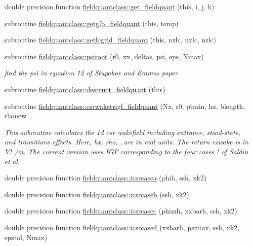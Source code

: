 \begin{DoxyCompactItemize}
double precision function \mbox{\hyperlink{namespacefieldquantclass_a5d4c07c22ffea0330d90b66e590b24a8}{fieldquantclass\+::get\+\_\+fieldquant}} (this, i, j, k)
\item 
subroutine \mbox{\hyperlink{namespacefieldquantclass_a2c0b0d0301e9ae5ccd8b2273ffc95ff3}{fieldquantclass\+::getglb\+\_\+fieldquant}} (this, temp)
\item 
subroutine \mbox{\hyperlink{namespacefieldquantclass_aa439599c2570610c1c2e0bfacc135603}{fieldquantclass\+::getlcgrid\+\_\+fieldquant}} (this, nxlc, nylc, nzlc)
\item 
subroutine \mbox{\hyperlink{namespacefieldquantclass_ae02f70d677d4bedfa6e41bd6cf33d612}{fieldquantclass\+::psiroot}} (r0, xx, deltas, psi, eps, Nmax)
\begin{DoxyCompactList}\small\item\em find the psi in equation 12 of Stupakov and Emma\textquotesingle{}s paper \end{DoxyCompactList}\item 
subroutine \mbox{\hyperlink{namespacefieldquantclass_a4e8922c1e25eef99306f4001c7289ba0}{fieldquantclass\+::destruct\+\_\+fieldquant}} (this)
\item 
subroutine \mbox{\hyperlink{namespacefieldquantclass_ac3c0238f350487871fdbe6a84bcdfc2e}{fieldquantclass\+::csrwaketrigf\+\_\+fieldquant}} (Nx, r0, ptmin, hx, blength, rhonew
\begin{DoxyCompactList}\small\item\em This subroutine calculates the 1d csr wakefield including entrance, stead-\/state, and transitions effects. Here, hx, rho,...are in real units. The return ezwake is in V! /m. The current version uses I\+GF corresponding to the four cases ! of Saldin et al. \end{DoxyCompactList}\item 
double precision function \mbox{\hyperlink{namespacefieldquantclass_a7431c26c185c399c546e1ac54043bad4}{fieldquantclass\+::icsrcasea}} (phih, ssh, xk2)
\item 
double precision function \mbox{\hyperlink{namespacefieldquantclass_ac6ac81d1607e424c294650bb3f89aa5c}{fieldquantclass\+::icsrcaseb}} (ssh, xk2)
\item 
double precision function \mbox{\hyperlink{namespacefieldquantclass_a85aac5a4f515439e4263b24518d8c9dc}{fieldquantclass\+::icsrcasec}} (phimh, xxbarh, ssh, xk2)
\item 
double precision function \mbox{\hyperlink{namespacefieldquantclass_a6e7b51293ed012f0a90b5de96a3cef05}{fieldquantclass\+::icsrcased}} (xxbarh, psimax, ssh, xk2, epstol, Nmax)

\end{DoxyCompactItemize}
